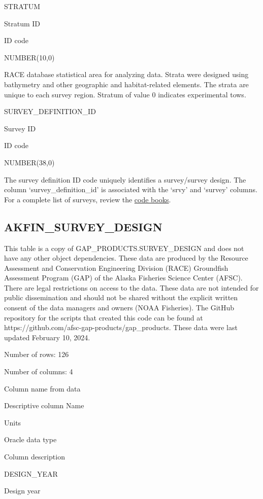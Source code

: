 \documentclass[
  letterpaper,
  oneside,
  open=any]{scrbook}
\begin{document}
STRATUM

Stratum ID

ID code

NUMBER(10,0)

RACE database statistical area for analyzing data. Strata were designed
using bathymetry and other geographic and habitat-related elements. The
strata are unique to each survey region. Stratum of value 0 indicates
experimental tows.

SURVEY\_DEFINITION\_ID

Survey ID

ID code

NUMBER(38,0)

The survey definition ID code uniquely identifies a survey/survey
design. The column `survey\_definition\_id' is associated with the
`srvy' and `survey' columns. For a complete list of surveys, review the
\href{https://www.fisheries.noaa.gov/resource/document/groundfish-survey-species-code-manual-and-data-codes-manual}{code
books}.

\hypertarget{akfin_survey_design}{%
\subsection{AKFIN\_SURVEY\_DESIGN}\label{akfin_survey_design}}

This table is a copy of GAP\_PRODUCTS.SURVEY\_DESIGN and does not have
any other object dependencies. These data are produced by the Resource
Assessment and Conservation Engineering Division (RACE) Groundfish
Assessment Program (GAP) of the Alaska Fisheries Science Center (AFSC).
There are legal restrictions on access to the data. These data are not
intended for public dissemination and should not be shared without the
explicit written consent of the data managers and owners (NOAA
Fisheries). The GitHub repository for the scripts that created this code
can be found at https://github.com/afsc-gap-products/gap\_products.
These data were last updated February 10, 2024.

Number of rows: 126

Number of columns: 4

Column name from data

Descriptive column Name

Units

Oracle data type

Column description

DESIGN\_YEAR

Design year
\end{document}
